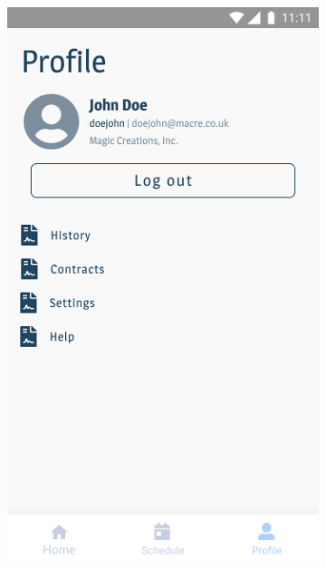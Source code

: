 \documentclass[twoside]{ctuthesis}
\begin{document}
\begin{figure}[h]
	\centering
	\begin{subfigure}{.5\textwidth}
		\centering
		\includegraphics[width=.9\linewidth]{img/v1-main-profile.png}
		\label{fig:v1-shift}
	\end{subfigure}%
	\begin{subfigure}[h!]{.5\textwidth}
		\centering

\end{subfigure}
\end{figure}
\end{document}
